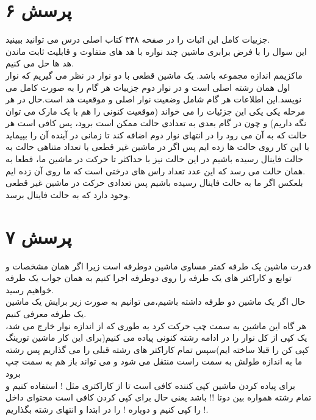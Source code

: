 \documentclass[a4paper]{article}
\begin{document}
\section*{پرسش ۶}
جزییات کامل این اثبات را در صفحه ۳۴۸ کتاب اصلی درس می توانید ببینید.\\
این سوال را با فرض برابری ماشین چند نواره با هد های متفاوت و قابلیت ثابت ماندن هد ها حل می کنیم.\\
ماکزیمم اندازه مجموعه
باشد. یک ماشین قطعی با دو نوار در نظر می گیریم که نوار اول همان رشته اصلی است و در نوار دوم جزییات هر گام را به صورت کامل می نویسد.این اطلاعات هر گام شامل وضعیت نوار اصلی و موقعیت هد است.حال در هر مرحله یکی یکی این جزئیات را می خواند (موقعیت کنونی را هم با یک مارک می توان نگه داریم) و چون در گام بعدی به تعدادی حالت ممکن است برود، پس کافی است هر حالت که به آن می رود را در انتهای نوار دوم اضافه کند تا زمانی در آینده آن را بپیماید\\
با این کار
روی حالت ها زده ایم پس اگر در ماشین غیر قطعی با تعداد متناهی حالت 
به حالت فاینال رسیده باشیم در این حالت نیز با حداکثر
تا حرکت در ماشین ما، قطعا به همان حالت می رسد که این عدد تعداد 
راس های درختی است که ما روی آن
زده ایم.\\
بلعکس اگر ما به حالت فاینال رسیده باشیم پس تعدادی حرکت در ماشین غیر قطعی وجود دارد که به حالت فاینال برسد.
\pagebreak

\section*{پرسش ۷}
قدرت ماشین یک طرفه کمتر مساوی ماشین دوطرفه است زیرا اگر همان مشخصات و توابع و کاراکتر های یک طرفه را روی دوطرفه اجرا کنیم به همان جواب یک طرفه خواهیم رسید.\\
حال اگر یک ماشین دو طرفه داشته باشیم،می توانیم به صورت زیر برایش یک ماشین یک طرفه معرفی کنیم.\\
هر گاه این ماشین به سمت چپ حرکت کرد به طوری که از اندازه نوار خارج می شد، یک کپی از کل نوار را در ادامه رشته کنونی پیاده می کنیم(برای این کار ماشین تورینگ کپی کن را قبلا ساخته ایم)سپس تمام کاراکتر های رشته قبلی را 
می گذاریم پس رشته ما به اندازه طولش به سمت راست منتقل می شود و می تواند باز هم به سمت چپ برود\\
برای پیاده کردن ماشین کپی کننده کافی است تا از کاراکتری مثل ! استفاده کنیم و تمام رشته همواره بین دوتا !! باشد یعنی 
حال برای کپی کردن کافی است محتوای داخل ! را کپی کنیم و دوباره ! را در ابتدا و انتهای رشته بگذاریم.\\
\pagebreak
\end{document}
